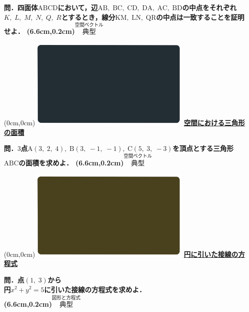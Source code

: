 \documentclass[10pt,
fleqn,
dvipdfmx,
uplatex
]{jsarticle}
\begin{document}
\Large 
\bf\boldmath 問．四面体$\text{ABCD}$において，辺$\text{AB},\;\text{BC},\;\text{CD},\;\text{DA},\;\text{AC},\;\text{BD}$の中点をそれぞれ$K,\;L,\;M,\;N,\;Q,\;R$とするとき，線分$\text{KM},\;\text{LN},\;\text{QR}$の中点は一致することを証明せよ．
\at(6.6cm,0.2cm){\small\color{bradorange}$\overset{\text{空間ベクトル}}{\text{典型}}$}


\newpage



\at(0cm,0cm){\includegraphics[width=8cm,bb=0 0 1920 1080]{./youtube/thumbnails/templates/smart_background/空間ベクトル.jpeg}}
{\color{orange}\bf\boldmath\Large\underline{空間における三角形の面積}}\vspace{0.3zw}

\LARGE 
\bf\boldmath 問．$3$点$\text{A}\left(3,\;2,\;4\right),\;\text{B}\left(3,\;-1,\;-1\right),\;\text{C}\left(5,\;3,\;-3\right)$を頂点とする三角形$\text{ABC}$の面積を求めよ．
\at(6.6cm,0.2cm){\small\color{bradorange}$\overset{\text{空間ベクトル}}{\text{典型}}$}


\newpage

\at(0cm,0cm){\includegraphics[width=8cm,bb=0 0 1920 1080]{./youtube/thumbnails/templates/smart_background/図形と方程式.jpeg}}
{\color{orange}\bf\boldmath\Large\underline{円に引いた接線の方程式}}\vspace{0.3zw}

\huge 
\bf\boldmath 問．点$\left(1,\;3\right)$から\\
円$x^2+y^2=5$に引いた接線の方程式を求めよ．\\

\at(6.6cm,0.2cm){\small\color{bradorange}$\overset{\text{図形と方程式}}{\text{典型}}$}
\end{document}

